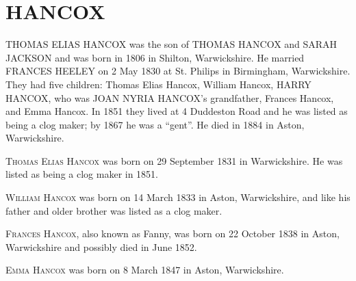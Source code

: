 \section{HANCOX}

\uppercase{Thomas Elias Hancox} was the son of \uppercase{Thomas Hancox} and \uppercase{Sarah Jackson} and was born in 1806 in Shilton, Warwickshire.  He married \uppercase{Frances Heeley} on	2 May 1830 at St. Philips in	Birmingham, Warwickshire. They had five children: Thomas Elias Hancox, William Hancox, \uppercase{Harry Hancox}, who was \uppercase{Joan Nyria Hancox}'s grandfather, Frances Hancox, and Emma Hancox.  In 1851 they lived at 4 Duddeston Road and he was listed as being a clog maker; by 1867 he was a ``gent''. He died in 1884 in Aston, Warwickshire.

\textsc{Thomas Elias Hancox} was born on 29 September 1831 in	Warwickshire. He was listed as being a clog maker in 1851.

\textsc{William Hancox} was born on 14 March 1833 in Aston, Warwickshire, and like his father and older brother was listed as a clog maker.

\textsc{Frances Hancox}, also known as Fanny, was born on 22 October 1838 in Aston, Warwickshire and possibly died in June 1852.

\textsc{Emma Hancox} was born on	8 March 1847 in	Aston, Warwickshire.

